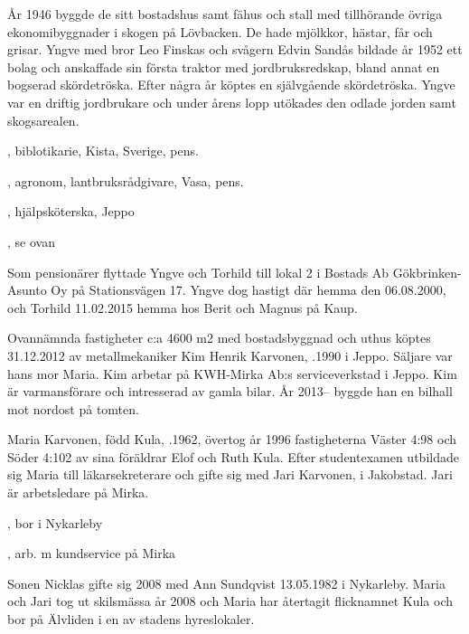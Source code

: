 År 1946 byggde de sitt bostadshus samt fähus och stall med tillhörande övriga ekonomibyggnader i skogen på Lövbacken. De hade mjölkkor, hästar, får och grisar. Yngve med bror Leo Finskas och svågern Edvin Sandås bildade år 1952 ett bolag och anskaffade sin första traktor med jordbruksredskap, bland annat en bogserad skördetröska. Efter några år köptes en självgående skördetröska. Yngve var en driftig jordbrukare och under årens lopp utökades den odlade jorden samt skogsarealen.
\begin{jhchildren}
  \item {}, biblotikarie, Kista, Sverige, pens.
  \item {}, agronom, lantbruksrådgivare, Vasa, pens.
  \item {}, hjälpsköterska, Jeppo
  \item {}, se ovan
\end{jhchildren}
Som pensionärer flyttade Yngve och Torhild till lokal 2 i Bostads Ab Gökbrinken-Asunto Oy på Stationsvägen 17. Yngve dog hastigt där hemma den 06.08.2000, och Torhild 11.02.2015 hemma hos Berit och Magnus på Kaup.






Ovannämnda fastigheter c:a 4600 m2 med bostadsbyggnad och uthus köptes 31.12.2012 av metallmekaniker Kim Henrik Karvonen, .1990 i Jeppo. Säljare var hans mor Maria. Kim arbetar på KWH-Mirka Ab:s serviceverkstad i Jeppo. Kim är varmansförare och intresserad av gamla bilar. År 2013-- byggde han en bilhall mot nordost på tomten.


Maria Karvonen, född Kula, .1962, övertog år 1996 fastigheterna	Väster 4:98 och Söder 4:102 av sina föräldrar Elof och Ruth Kula. Efter studentexamen utbildade sig Maria till läkarsekreterare och gifte sig med Jari Karvonen,  i Jakobstad. Jari är arbetsledare på Mirka.
\begin{jhchildren}
  \item {}, bor i Nykarleby
  \item {}
  \item {}, arb. m kundservice på Mirka
\end{jhchildren}
Sonen Nicklas gifte sig 2008 med Ann Sundqvist 13.05.1982 i Nykarleby. Maria och Jari tog ut skilsmässa år 2008 och Maria har återtagit flicknamnet Kula och bor på Älvliden i en av stadens hyreslokaler.


